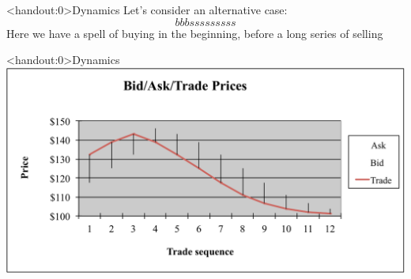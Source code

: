 \documentclass[english,10pt]{beamer}
\begin{document}
\begin{frame}<handout:0>{Dynamics}
	Let's consider an alternative case:
	\[
	bbbsssssssss
	\]
	Here we have a spell of buying in the beginning, before a long series of selling
\end{frame}


\begin{frame}<handout:0>{Dynamics}
	\includegraphics[width=1\linewidth]{pics/Bubble_Image.pdf}
	\hyperlink{example}{}
\end{frame}
\end{document}
